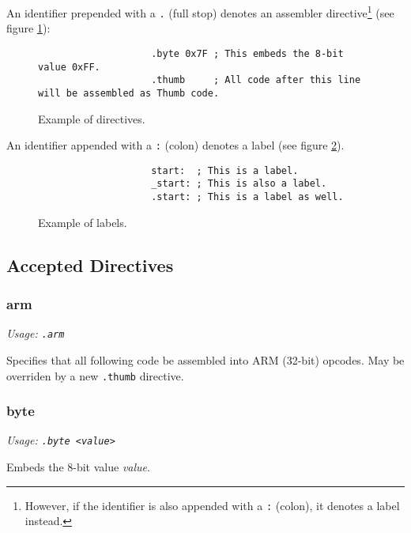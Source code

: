\documentclass[a4paper]{article}
\begin{document}
		An identifier prepended with a \texttt{.} (full stop) denotes an assembler directive\footnote{However, if the identifier is also appended with a \texttt{:} (colon), it denotes a label instead.} (see figure \ref{fig:directives}):

		\begin{figure}[h]
			\centering

			\caption{Example of directives.}
			\label{fig:directives}
			\begin{varwidth}{\linewidth}
				\begin{verbatim}
					.byte 0x7F ; This embeds the 8-bit value 0xFF.
					.thumb     ; All code after this line will be assembled as Thumb code.
				\end{verbatim}
			\end{varwidth}
		\end{figure}

		An identifier appended with a \texttt{:} (colon) denotes a label (see figure \ref{fig:labels}).

		\begin{figure}[h]
			\centering

			\caption{Example of labels.}
			\label{fig:labels}
			\begin{varwidth}{\linewidth}
				\begin{verbatim}
					start:  ; This is a label.
					_start: ; This is also a label.
					.start: ; This is a label as well.
				\end{verbatim}
			\end{varwidth}
		\end{figure}

		\subsection{Accepted Directives}
			\subsubsection{arm}
				\textit{Usage: \texttt{.arm}}

				Specifies that all following code be assembled into ARM (32-bit) opcodes. May be overriden by a new \texttt{.thumb} directive.

			\subsubsection{byte}
				\textit{Usage: \texttt{.byte <value>}}

				Embeds the 8-bit value \textit{value}.
\end{document}
